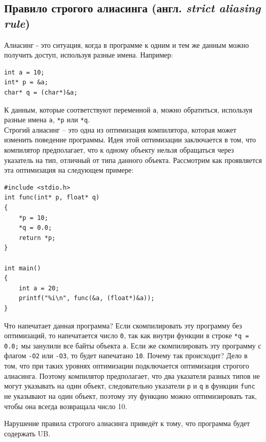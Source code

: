 \documentclass[10pt]{article}
\begin{document}
\subsection*{Правило строгого алиасинга (англ. \textit{strict aliasing rule})}
Алиасинг - это ситуация, когда в программе к одним и тем же данным можно получить доступ, используя разные имена. Например:
\begin{lstlisting}
int a = 10;
int* p = &a;
char* q = (char*)&a;
\end{lstlisting}
К данным, которые соответствуют переменной \texttt{a}, можно обратиться, используя разные имена \texttt{a}, \texttt{*p} или \texttt{*q}.\\
Строгий алиасинг -- это одна из оптимизация компилятора, которая может изменить поведение программы. Идея этой оптимизации заключается в том, что компилятор предполагает, что к одному объекту нельзя обращаться через указатель на тип, отличный от типа данного объекта. Рассмотрим как проявляется эта оптимизация на следующем примере:

\begin{lstlisting}
#include <stdio.h>
int func(int* p, float* q)
{
    *p = 10;
    *q = 0.0;
    return *p;
}

int main() 
{
    int a = 20;
    printf("%i\n", func(&a, (float*)&a));
}
\end{lstlisting}
Что напечатает данная программа? Если скомпилировать эту программу без оптимизаций, то напечатается число \texttt{0}, так как внутри функции в строке \texttt{*q = 0.0;} мы занулили все байты объекта \texttt{a}. Если же скомпилировать эту программу с флагом \texttt{-O2} или \texttt{-O3}, то будет напечатано \texttt{10}. Почему так происходит? Дело в том, что при таких уровнях оптимизации подключается оптимизация строгого алиасинга. Поэтому компилятор предполагает, что два указателя разных типов не могут указывать на один объект, следовательно указатели \texttt{p} и \texttt{q} в функции \texttt{func} не указывают на один объект, поэтому эту функцию можно оптимизировать так, чтобы она всегда возвращала число 10.

Нарушение правила строгого алиасинга приведёт к тому, что программа будет содержать UB. 
\end{document}
